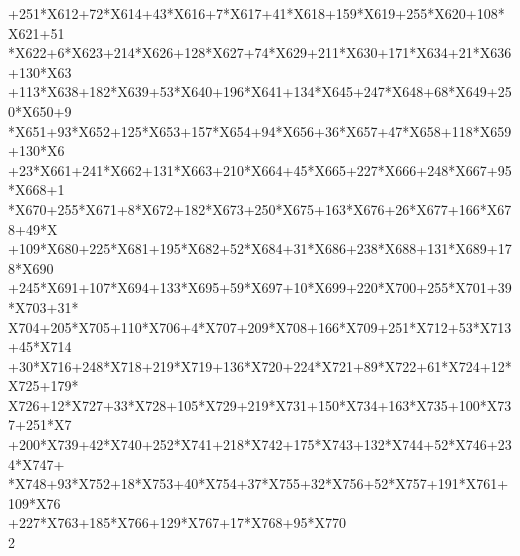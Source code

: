 \begin{tabbing}
+251*X612+72*X614+43*X616+7*X617+41*X618+159*X619+255*X620+108*X621+51\\[0pt]
\>*X622+6*X623+214*X626+128*X627+74*X629+211*X630+171*X634+21*X636+130*X63\\[0pt]
+113*X638+182*X639+53*X640+196*X641+134*X645+247*X648+68*X649+250*X650+9\\[0pt]
*X651+93*X652+125*X653+157*X654+94*X656+36*X657+47*X658+118*X659+130*X6\\[0pt]
+23*X661+241*X662+131*X663+210*X664+45*X665+227*X666+248*X667+95*X668+1\\[0pt]
*X670+255*X671+8*X672+182*X673+250*X675+163*X676+26*X677+166*X678+49*X\\[0pt]
+109*X680+225*X681+195*X682+52*X684+31*X686+238*X688+131*X689+178*X690\\[0pt]
\>+245*X691+107*X694+133*X695+59*X697+10*X699+220*X700+255*X701+39*X703+31*\\[0pt]
\>X704+205*X705+110*X706+4*X707+209*X708+166*X709+251*X712+53*X713+45*X714\\[0pt]
\>+30*X716+248*X718+219*X719+136*X720+224*X721+89*X722+61*X724+12*X725+179*\\[0pt]
\>X726+12*X727+33*X728+105*X729+219*X731+150*X734+163*X735+100*X737+251*X7\\[0pt]
+200*X739+42*X740+252*X741+218*X742+175*X743+132*X744+52*X746+234*X747+\\[0pt]
*X748+93*X752+18*X753+40*X754+37*X755+32*X756+52*X757+191*X761+109*X76\\[0pt]
+227*X763+185*X766+129*X767+17*X768+95*X770\\[0pt]
2\>\end{tabbing}
